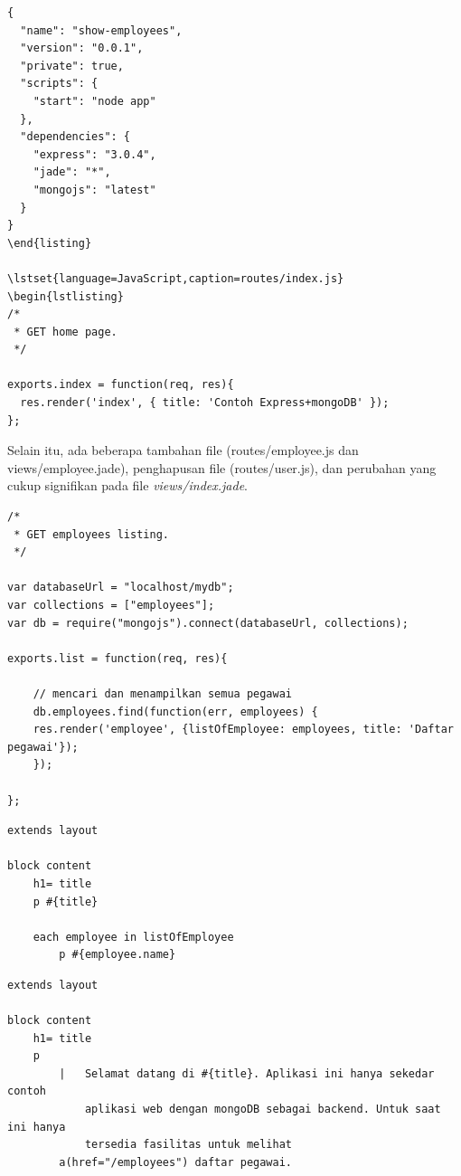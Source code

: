 \lstset{language=JavaScript,caption=package.json}
\begin{lstlisting}
{
  "name": "show-employees",
  "version": "0.0.1",
  "private": true,
  "scripts": {
    "start": "node app"
  },
  "dependencies": {
    "express": "3.0.4",
    "jade": "*",
    "mongojs": "latest"
  }
}
\end{listing}

\lstset{language=JavaScript,caption=routes/index.js}
\begin{lstlisting}
/*
 * GET home page.
 */

exports.index = function(req, res){
  res.render('index', { title: 'Contoh Express+mongoDB' });
};
\end{lstlisting}

Selain itu, ada beberapa tambahan file (routes/employee.js dan views/employee.jade), penghapusan file (routes/user.js), dan perubahan yang cukup signifikan pada file \textit{views/index.jade}.

\lstset{language=JavaScript,caption=routes/employee.js}
\begin{lstlisting}
/*
 * GET employees listing.
 */

var databaseUrl = "localhost/mydb";
var collections = ["employees"];
var db = require("mongojs").connect(databaseUrl, collections);

exports.list = function(req, res){

	// mencari dan menampilkan semua pegawai
	db.employees.find(function(err, employees) {
  	res.render('employee', {listOfEmployee: employees, title: 'Daftar pegawai'});
	});

};
\end{lstlisting}

\lstset{language=html,caption=views/employee.jade}
\begin{lstlisting}
extends layout

block content
	h1= title
	p #{title}

	each employee in listOfEmployee
		p #{employee.name}
\end{lstlisting}

\lstset{language=html,caption=views/index.jade}
\begin{lstlisting}
extends layout

block content
	h1= title
	p 
		|	Selamat datang di #{title}. Aplikasi ini hanya sekedar contoh 
			aplikasi web dengan mongoDB sebagai backend. Untuk saat ini hanya 
			tersedia fasilitas untuk melihat 
		a(href="/employees") daftar pegawai.
\end{lstlisting}
